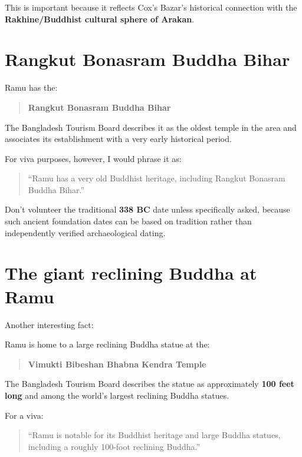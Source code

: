 This is important because it reflects Cox's Bazar's historical connection with the \textbf{Rakhine/Buddhist cultural sphere of Arakan}.

\medskip

\section{Rangkut Bonasram Buddha Bihar}

Ramu has the:

\begin{quote}
\textbf{Rangkut Bonasram Buddha Bihar}\\
\end{quote}

The Bangladesh Tourism Board describes it as the oldest temple in the area and associates its establishment with a very early historical period.

For viva purposes, however, I would phrase it as:

\begin{quote}
``Ramu has a very old Buddhist heritage, including Rangkut Bonasram Buddha Bihar.''\\
\end{quote}

Don't volunteer the traditional \textbf{338 BC} date unless specifically asked, because such ancient foundation dates can be based on tradition rather than independently verified archaeological dating.

\medskip

\section{The giant reclining Buddha at Ramu}

Another interesting fact:

Ramu is home to a large reclining Buddha statue at the:

\begin{quote}
\textbf{Vimukti Bibeshan Bhabna Kendra Temple}\\
\end{quote}

The Bangladesh Tourism Board describes the statue as approximately \textbf{100 feet long} and among the world's largest reclining Buddha statues.

For a viva:

\begin{quote}
``Ramu is notable for its Buddhist heritage and large Buddha statues, including a roughly 100-foot reclining Buddha.''\\
\end{quote}

